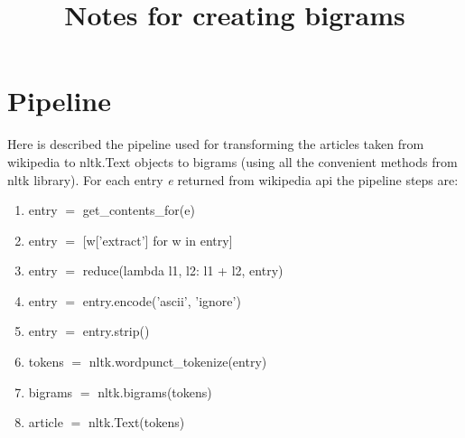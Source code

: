 \documentclass{article}
\title{Notes for creating bigrams}
\begin{document}
\section*{Pipeline}
Here is described the pipeline used for transforming
the articles taken from wikipedia to nltk.Text objects to 
bigrams (using all the convenient methods from nltk library).
For each entry \textit{e} returned from wikipedia api the pipeline steps are:
\begin{enumerate}
    \item{entry $=$ get\_contents\_for(e)}
    \item{entry $=$ [w['extract'] for w in entry]}
    \item{entry $=$ reduce(lambda l1, l2: l1 + l2, entry)}
    \item{entry $=$ entry.encode('ascii', 'ignore')}
    \item{entry $=$ entry.strip()}
    \item{tokens $=$ nltk.wordpunct\_tokenize(entry)}
    \item{bigrams $=$ nltk.bigrams(tokens)}
    \item{article $=$ nltk.Text(tokens)} 
\end{enumerate}
\end{document}
